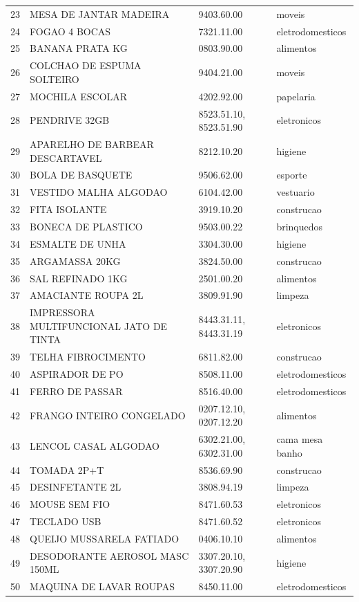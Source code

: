 \begin{apendicesenv}
\begin{center}
\begin{longtable}{r p{6.6cm} p{4.4cm} p{2.6cm}}
23 & MESA DE JANTAR MADEIRA & 9403.60.00 & moveis \\
24 & FOGAO 4 BOCAS & 7321.11.00 & eletrodomesticos \\
25 & BANANA PRATA KG & 0803.90.00 & alimentos \\
26 & COLCHAO DE ESPUMA SOLTEIRO & 9404.21.00 & moveis \\
27 & MOCHILA ESCOLAR & 4202.92.00 & papelaria \\
28 & PENDRIVE 32GB & 8523.51.10, 8523.51.90 & eletronicos \\
29 & APARELHO DE BARBEAR DESCARTAVEL & 8212.10.20 & higiene \\
30 & BOLA DE BASQUETE & 9506.62.00 & esporte \\
31 & VESTIDO MALHA ALGODAO & 6104.42.00 & vestuario \\
32 & FITA ISOLANTE & 3919.10.20 & construcao \\
33 & BONECA DE PLASTICO & 9503.00.22 & brinquedos \\
34 & ESMALTE DE UNHA & 3304.30.00 & higiene \\
35 & ARGAMASSA 20KG & 3824.50.00 & construcao \\
36 & SAL REFINADO 1KG & 2501.00.20 & alimentos \\
37 & AMACIANTE ROUPA 2L & 3809.91.90 & limpeza \\
38 & IMPRESSORA MULTIFUNCIONAL JATO DE TINTA & 8443.31.11, 8443.31.19 & eletronicos \\
39 & TELHA FIBROCIMENTO & 6811.82.00 & construcao \\
40 & ASPIRADOR DE PO & 8508.11.00 & eletrodomesticos \\
41 & FERRO DE PASSAR & 8516.40.00 & eletrodomesticos \\
42 & FRANGO INTEIRO CONGELADO & 0207.12.10, 0207.12.20 & alimentos \\
43 & LENCOL CASAL ALGODAO & 6302.21.00, 6302.31.00 & cama mesa banho \\
44 & TOMADA 2P+T & 8536.69.90 & construcao \\
45 & DESINFETANTE 2L & 3808.94.19 & limpeza \\
46 & MOUSE SEM FIO & 8471.60.53 & eletronicos \\
47 & TECLADO USB & 8471.60.52 & eletronicos \\
48 & QUEIJO MUSSARELA FATIADO & 0406.10.10 & alimentos \\
49 & DESODORANTE AEROSOL MASC 150ML & 3307.20.10, 3307.20.90 & higiene \\
50 & MAQUINA DE LAVAR ROUPAS & 8450.11.00 & eletrodomesticos \\
\end{longtable}
\end{center}


\end{apendicesenv}
